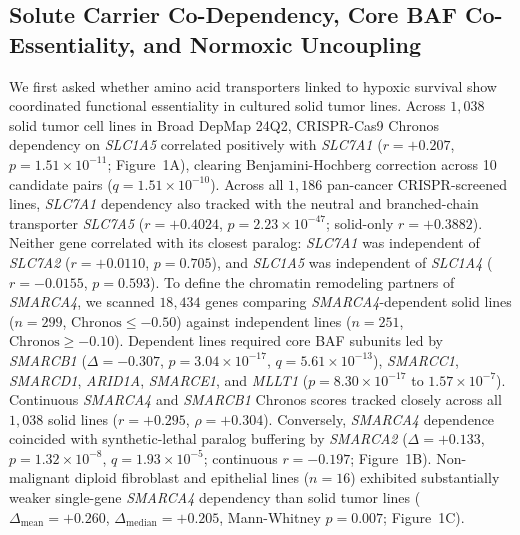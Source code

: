 \documentclass[10pt,twocolumn]{article}
\begin{document}
\subsection{Solute Carrier Co-Dependency, Core BAF Co-Essentiality, and Normoxic Uncoupling}
We first asked whether amino acid transporters linked to hypoxic survival show coordinated functional essentiality in cultured solid tumor lines. Across $1,038$ solid tumor cell lines in Broad DepMap 24Q2, CRISPR-Cas9 Chronos dependency on \textit{SLC1A5} correlated positively with \textit{SLC7A1} ($r = +0.207$, $p = 1.51 \times 10^{-11}$; Figure~1A), clearing Benjamini-Hochberg correction across 10 candidate pairs ($q = 1.51 \times 10^{-10}$). Across all $1,186$ pan-cancer CRISPR-screened lines, \textit{SLC7A1} dependency also tracked with the neutral and branched-chain transporter \textit{SLC7A5} ($r = +0.4024$, $p = 2.23 \times 10^{-47}$; solid-only $r = +0.3882$). Neither gene correlated with its closest paralog: \textit{SLC7A1} was independent of \textit{SLC7A2} ($r = +0.0110$, $p = 0.705$), and \textit{SLC1A5} was independent of \textit{SLC1A4} ($r = -0.0155$, $p = 0.593$). To define the chromatin remodeling partners of \textit{SMARCA4}, we scanned $18,434$ genes comparing \textit{SMARCA4}-dependent solid lines ($n = 299$, $\text{Chronos} \le -0.50$) against independent lines ($n = 251$, $\text{Chronos} \ge -0.10$). Dependent lines required core BAF subunits led by \textit{SMARCB1} ($\Delta = -0.307$, $p = 3.04 \times 10^{-17}$, $q = 5.61 \times 10^{-13}$), \textit{SMARCC1}, \textit{SMARCD1}, \textit{ARID1A}, \textit{SMARCE1}, and \textit{MLLT1} ($p = 8.30 \times 10^{-17}$ to $1.57 \times 10^{-7}$). Continuous \textit{SMARCA4} and \textit{SMARCB1} Chronos scores tracked closely across all $1,038$ solid lines ($r = +0.295$, $\rho = +0.304$). Conversely, \textit{SMARCA4} dependence coincided with synthetic-lethal paralog buffering by \textit{SMARCA2} ($\Delta = +0.133$, $p = 1.32 \times 10^{-8}$, $q = 1.93 \times 10^{-5}$; continuous $r = -0.197$; Figure~1B). Non-malignant diploid fibroblast and epithelial lines ($n = 16$) exhibited substantially weaker single-gene \textit{SMARCA4} dependency than solid tumor lines ($\Delta_{\text{mean}} = +0.260$, $\Delta_{\text{median}} = +0.205$, Mann-Whitney $p = 0.007$; Figure~1C).
\end{document}
